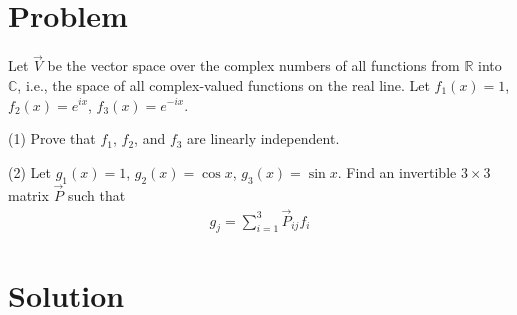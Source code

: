 \documentclass[journal,12pt,twocolumn]{IEEEtran}
\begin{document}
\section{Problem}
Let $\vec{V}$ be the vector space over the complex numbers of all functions from $\mathbb{R}$ into $\mathbb{C}$, i.e., the space of all complex-valued functions on the real line. Let $f_1(x)=1$, $f_2(x)=e^{ix}$, $f_3(x)=e^{-ix}$.

(1) Prove that $f_1$, $f_2$, and $f_3$ are linearly independent.

(2) Let $g_1(x)=1$, $g_2(x)=\cos{x}$, $g_3(x)=\sin{x}$. Find an invertible $3\times3$ matrix $\vec{P}$ such that
\begin{align}
    g_j=\sum\limits_{i=1}^3 \vec{P}_{ij}f_i\label{eq}
\end{align}
\section{Solution}
\end{document}
